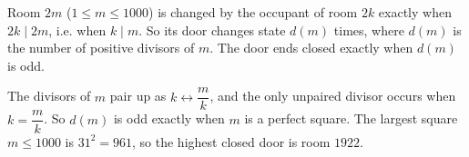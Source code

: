 Room $2m$ ($1\le m\le1000$) is changed by the occupant of room $2k$ exactly when $2k\mid2m$, i.e. when $k\mid m$. So its door changes state $d(m)$ times, where $d(m)$ is the number of positive divisors of $m$. The door ends closed exactly when $d(m)$ is odd.

The divisors of $m$ pair up as $k\leftrightarrow\dfrac mk$, and the only unpaired divisor occurs when $k=\dfrac mk$. So $d(m)$ is odd exactly when $m$ is a perfect square. The largest square $m\le1000$ is $31^2=961$, so the highest closed door is room $\boxed{1922}$.
